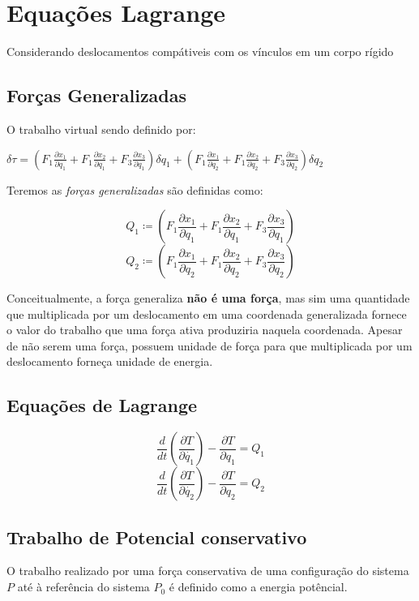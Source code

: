 \section{Equações Lagrange}

Considerando deslocamentos compátiveis com os vínculos em um corpo rígido

\subsection{Forças Generalizadas}

O trabalho virtual sendo definido por:

$\delta \tau = (F_1\frac{\partial x_1}{\partial q_1} + F_1\frac{\partial x_2}{\partial q_1} + F_3\frac{\partial x_3}{\partial q_1})\delta q_1 + (F_1\frac{\partial x_1}{\partial q_2} + F_1\frac{\partial x_2}{\partial q_2} + F_3\frac{\partial x_3}{\partial q_2})\delta q_2$

Teremos as \textit{forças generalizadas} são definidas como:

$$Q_1 \coloneqq (F_1\frac{\partial x_1}{\partial q_1} + F_1\frac{\partial x_2}{\partial q_1} + F_3\frac{\partial x_3}{\partial q_1})$$
$$Q_2 \coloneqq (F_1\frac{\partial x_1}{\partial q_2} + F_1\frac{\partial x_2}{\partial q_2} + F_3\frac{\partial x_3}{\partial q_2})$$

Conceitualmente, a força generaliza \textbf{não é uma força}, mas sim uma quantidade que multiplicada por um deslocamento em uma coordenada generalizada fornece o valor do trabalho que uma força ativa produziria naquela coordenada. Apesar de não serem uma força, possuem unidade de força para que multiplicada por um deslocamento forneça unidade de energia.

\subsection{Equações de Lagrange}

$$ \boxed{\frac{d}{dt}(\frac{\partial T}{\partial \dot{q_1}}) - \frac{\partial T}{\partial q_1} = Q_1}$$
$$ \boxed{\frac{d}{dt}(\frac{\partial T}{\partial \dot{q_2}}) - \frac{\partial T}{\partial q_2} = Q_2}$$

\subsection{Trabalho de Potencial conservativo}

O trabalho realizado por uma força conservativa de uma configuração do sistema $P$ até à referência do sistema $P_0$ é definido como a energia potêncial.

